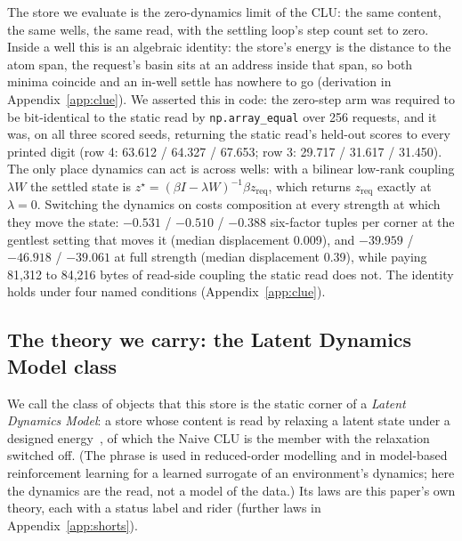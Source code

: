 \documentclass{article} %
\begin{document}
The store we evaluate is the zero-dynamics limit of the CLU: the same content, the same wells,
the same read, with the settling loop's step count set to zero. Inside a well this is an
algebraic identity: the store's energy is the distance to the atom span, the request's basin sits
at an address inside that span, so both minima coincide and an in-well settle has nowhere to go
(derivation in Appendix~\ref{app:clue}). We asserted this in code: the zero-step arm was required to be bit-identical to
the static read by \texttt{np.array\_equal} over 256 requests, and it was, on all three scored
seeds, returning the static read's held-out scores to every printed digit (row 4: 63.612 /
64.327 / 67.653; row 3: 29.717 / 31.617 / 31.450). %
The only place dynamics can act is across wells: with a bilinear low-rank coupling $\lambda W$
the settled state is $z^\star=(\beta I-\lambda W)^{-1}\beta z_{\text{req}}$, which returns
$z_{\text{req}}$ exactly at $\lambda=0$. Switching the dynamics on costs composition at every
strength at which they move the state: $-0.531$ / $-0.510$ / $-0.388$ six-factor tuples per
corner at the gentlest setting that moves it (median displacement 0.009), and $-39.959$ /
$-46.918$ / $-39.061$ at full strength (median displacement 0.39), while paying 81,312 to 84,216
bytes of read-side coupling the static read does not. %
The identity holds under four named conditions (Appendix~\ref{app:clue}).

\subsection{The theory we carry: the Latent Dynamics Model class}
\label{sec:theory}

We call the class of objects that this store is the static corner of a \emph{Latent Dynamics
Model}: a store whose content is read by relaxing a latent state under a designed energy~\citep{hopfield1982neural,krotov2016dense,ramsauer2021hopfield,hoover2023energy,kong2024reservoir}, of
which the Naive CLU is the member with the relaxation switched off. (The phrase is used in
reduced-order modelling and in model-based reinforcement learning for a learned surrogate of an
environment's dynamics; here the dynamics are the read, not a model of the data.) Its laws are this paper's own theory, each with a status label and rider (further laws in Appendix~\ref{app:shorts}).
\end{document}
